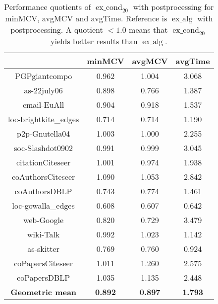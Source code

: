 \documentclass[pdftex]{llncs}
\newcommand{\excond}{\operatorname{ex\_cond}}
\newcommand{\exalg}{\operatorname{ex\_alg}}
\numberwithin{equation}{section}
\numberwithin{example}{section}
\numberwithin{table}{section}
\begin{document}
\begin{table}[tb]
  \caption{Performance quotients of $\excond_{20}$ with postprocessing for minMCV, avgMCV
    and avgTime. Reference is $\exalg$ with postprocessing. A quotient $< 1.0$ means that
    $\excond_{20}$ yields better results than $\exalg$.}
\begin{center}
\begin{tabular}{ c | c  c | c }
& minMCV  & avgMCV & avgTime\\
                        \hline \hline
PGPgiantcompo           &  0.962              &  1.004               &  3.068              \\ \hline
as-22july06             &  0.898              &  0.766               &  1.387              \\ \hline
email-EuAll             &  0.904              &  0.918               &  1.537              \\ \hline
loc-brightkite\_edges   &  0.714              &  0.714               &  1.190              \\ \hline
p2p-Gnutella04          &  1.003              &  1.000               &  2.255              \\ \hline
soc-Slashdot0902        &  0.991              &  0.999               &  3.045              \\ \hline
citationCiteseer        &  1.001              &  0.974               &  1.938              \\ \hline
coAuthorsCiteseer       &  1.090              &  1.053               &  2.842              \\ \hline 
coAuthorsDBLP           &  0.743              &  0.774               &  1.461              \\ \hline
loc-gowalla\_edges      &  0.608              &  0.607               &  0.642              \\ \hline
web-Google              &  0.820              &  0.729               &  3.479              \\ \hline
wiki-Talk               &  0.992              &  1.023               &  1.142              \\ \hline
as-skitter              &  0.769              &  0.760               &  0.924              \\ \hline
coPapersCiteseer        &  1.011              &  1.260               &  2.575              \\ \hline
coPapersDBLP            &  1.035              &  1.135               &  2.448              \\ \hline  \hline
\textbf{Geometric mean} &  \textbf{0.892}     &  \textbf{0.897}      &\textbf{1.793}       \\ \hline
\end{tabular}
\end{center}
\label{tab:MCV_20}
\end{table}
\end{document}
